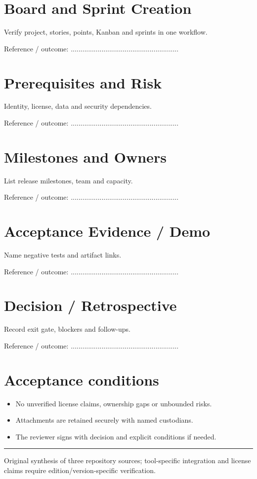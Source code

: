 \documentclass[10pt,letterpaper]{article}
\begin{document}
\section{Board and Sprint Creation}
Verify project, stories, points, Kanban and sprints in one workflow.\par
Reference / outcome: ........................................................\par
\section{Prerequisites and Risk}
Identity, license, data and security dependencies.\par
Reference / outcome: ........................................................\par
\section{Milestones and Owners}
List release milestones, team and capacity.\par
Reference / outcome: ........................................................\par
\section{Acceptance Evidence / Demo}
Name negative tests and artifact links.\par
Reference / outcome: ........................................................\par
\section{Decision / Retrospective}
Record exit gate, blockers and follow-ups.\par
Reference / outcome: ........................................................\par
\section{Acceptance conditions}
\begin{itemize}
\item No unverified license claims, ownership gaps or unbounded risks.
\item Attachments are retained securely with named custodians.
\item The reviewer signs with decision and explicit conditions if needed.
\end{itemize}
\vfill\noindent\color{muted}\rule{\linewidth}{0.4pt}\par\scriptsize Original synthesis of three repository sources; tool-specific integration and license claims require edition/version-specific verification.\normalsize
\end{document}
